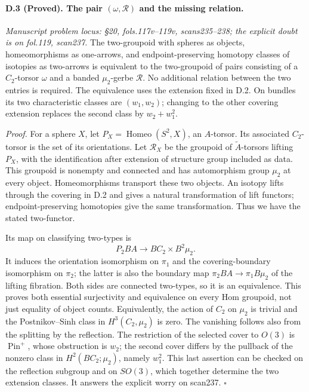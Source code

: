 \paragraph{D.3 (Proved). The pair $(\omega,\mathcal R)$ and the missing relation.}
\emph{Manuscript problem locus: \S20, fols.117v--119v, scans235--238; the explicit doubt is on fol.119, scan237.}
The two-groupoid with spheres as objects, homeomorphisms as one-arrows, and endpoint-preserving homotopy classes of isotopies as two-arrows is equivalent to the two-groupoid of pairs consisting of a $C_2$-torsor $\omega$ and a banded $\mu_2$-gerbe $\mathcal R$. No additional relation between the two entries is required. The equivalence uses the extension fixed in D.2. On bundles its two characteristic classes are $(w_1,w_2)$; changing to the other covering extension replaces the second class by $w_2+w_1^2$.

\emph{Proof.} For a sphere $X$, let $P_X=\operatorname{Homeo}(S^2,X)$, an $A$-torsor. Its associated $C_2$-torsor is the set of its orientations. Let $\mathcal R_X$ be the groupoid of $\widetilde A$-torsors lifting $P_X$, with the identification after extension of structure group included as data. This groupoid is nonempty and connected and has automorphism group $\mu_2$ at every object. Homeomorphisms transport these two objects. An isotopy lifts through the covering in D.2 and gives a natural transformation of lift functors; endpoint-preserving homotopies give the same transformation. Thus we have the stated two-functor.

Its map on classifying two-types is
\[
P_2BA\longrightarrow BC_2\times B^2\mu_2.
\]
It induces the orientation isomorphism on $\pi_1$ and the covering-boundary isomorphism on $\pi_2$; the latter is also the boundary map $\pi_2BA\to\pi_1B\mu_2$ of the lifting fibration. Both sides are connected two-types, so it is an equivalence. This proves both essential surjectivity and equivalence on every Hom groupoid, not just equality of object counts. Equivalently, the action of $C_2$ on $\mu_2$ is trivial and the Postnikov--Sinh class in $H^3(C_2,\mu_2)$ is zero. The vanishing follows also from the splitting by the reflection. The restriction of the selected cover to $O(3)$ is $\operatorname{Pin}^+$, whose obstruction is $w_2$; the second cover differs by the pullback of the nonzero class in $H^2(BC_2;\mu_2)$, namely $w_1^2$. This last assertion can be checked on the reflection subgroup and on $SO(3)$, which together determine the two extension classes. It answers the explicit worry on scan237. \hfill$\square$

